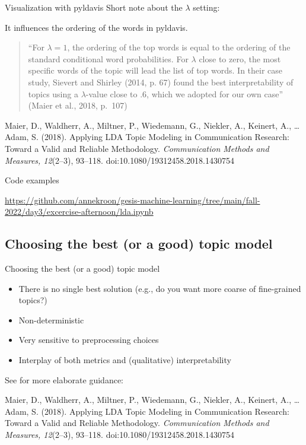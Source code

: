 \documentclass[compress]{beamer}
\begin{document}
\begin{frame}{Visualization with pyldavis}
Short note about the $\lambda$ setting:

It influences the ordering of the words in pyldavis.

\begin{quote}
``For $\lambda = 1$, the ordering of the top words is equal to the ordering of the standard conditional word probabilities. For $\lambda$ close to zero, the most specific words of the topic will lead the list of top words. In their case study, Sievert and Shirley (2014, p. 67) found the best interpretability of topics using a  $\lambda$-value close to .6, which we adopted for our own case'' (Maier et al., 2018, p.~107)
\end{quote}


\tiny{Maier, D., Waldherr, A., Miltner, P., Wiedemann, G., Niekler, A., Keinert, A., \ldots Adam, S. (2018). Applying LDA Topic Modeling in Communication Research: Toward a Valid and Reliable Methodology. \textit{Communication Methods and Measures, 12}(2--3), 93--118. doi:10.1080/19312458.2018.1430754}
\end{frame}

\begin{frame}[plain]{Code examples}


\url{https://github.com/annekroon/gesis-machine-learning/tree/main/fall-2022/day3/excercise-afternoon/lda.ipynb}
\end{frame}



\subsection{Choosing the best (or a good) topic model}

\begin{frame}{Choosing the best (or a good) topic model}
\begin{itemize}
	\item There is no single best solution (e.g., do you want more coarse of fine-grained topics?)
	\item Non-deterministic
	\item Very sensitive to preprocessing choices
	\item Interplay of both metrics and (qualitative) interpretability 
\end{itemize}

See for more elaborate guidance:

\tiny{Maier, D., Waldherr, A., Miltner, P., Wiedemann, G., Niekler, A., Keinert, A., \ldots Adam, S. (2018). Applying LDA Topic Modeling in Communication Research: Toward a Valid and Reliable Methodology. \textit{Communication Methods and Measures, 12}(2--3), 93--118. doi:10.1080/19312458.2018.1430754}

\end{frame}
\end{document}
